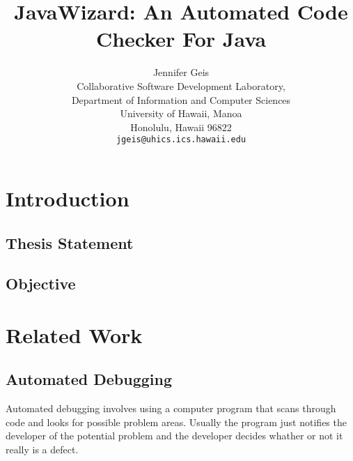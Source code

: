 

\setcounter{secnumdepth}{6}
\setcounter{tocdepth}{6}



\title{JavaWizard: An Automated Code Checker For Java} \author{Jennifer
  Geis\\ Collaborative Software Development Laboratory,\\ Department of
  Information and Computer Sciences\\ University of Hawaii, Manoa\\ 
  Honolulu, Hawaii 96822\\ {\tt jgeis@uhics.ics.hawaii.edu}} \maketitle

\tableofcontents

\chapter{Introduction}
\section{Thesis Statement} 
\section{Objective}

\chapter{Related Work}
\section{Automated Debugging}
Automated debugging involves using a computer program that scans through
code and looks for possible problem areas. Usually the program just
notifies the developer of the potential problem and the developer decides
whather or not it really is a defect.

